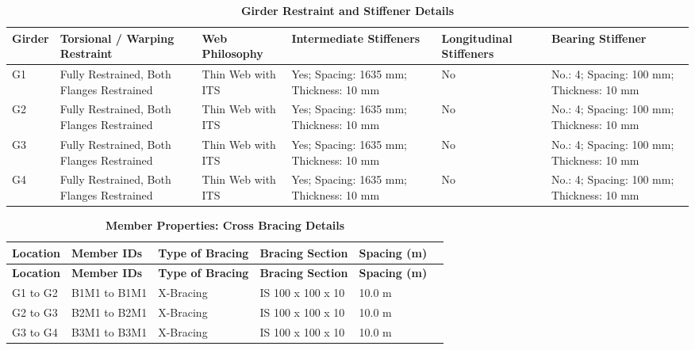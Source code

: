 \documentclass[12pt,a4paper]{report}
\newcommand{\ReportCompactTable}{\setlength{\tabcolsep}{3.5pt}}
\newcommand{\ReportLeftAlignedLongTable}{\setlength{\LTleft}{0pt}\setlength{\LTright}{\fill}}
\numberwithin{table}{chapter}
\numberwithin{figure}{chapter}
\begin{document}
\vspace{0.6em}

\vspace{4pt}
\begin{longtable}{|L{1.4cm}|p{2.2cm}|p{2.2cm}|p{3.0cm}|p{2.4cm}|p{2.2cm}|}
\caption{\textbf{Girder Restraint and Stiffener Details}}\\
\hline
\textbf{Girder} & \textbf{Torsional / Warping Restraint} & \textbf{Web Philosophy} & \textbf{Intermediate Stiffeners} & \textbf{Longitudinal Stiffeners} & \textbf{Bearing Stiffener} \\[6pt]
\hline
\endfirsthead
\endhead

G1 & Fully Restrained, Both Flanges Restrained & Thin Web with ITS & Yes; Spacing: 1635 mm; Thickness: 10 mm & No & No.: 4; Spacing: 100 mm; Thickness: 10 mm \\[8pt]
\hline
G2 & Fully Restrained, Both Flanges Restrained & Thin Web with ITS & Yes; Spacing: 1635 mm; Thickness: 10 mm & No & No.: 4; Spacing: 100 mm; Thickness: 10 mm \\[8pt]
\hline
G3 & Fully Restrained, Both Flanges Restrained & Thin Web with ITS & Yes; Spacing: 1635 mm; Thickness: 10 mm & No & No.: 4; Spacing: 100 mm; Thickness: 10 mm \\[8pt]
\hline
G4 & Fully Restrained, Both Flanges Restrained & Thin Web with ITS & Yes; Spacing: 1635 mm; Thickness: 10 mm & No & No.: 4; Spacing: 100 mm; Thickness: 10 mm \\[8pt]
\hline
\end{longtable}



\newpage

\vspace{0.4em}
\ReportCompactTable
\ReportLeftAlignedLongTable

\begin{longtable}{|L{2.2cm}|L{2.2cm}|L{3.0cm}|L{2.5cm}|C{1.8cm}|C{1.8cm}|}
\caption{\textbf{Member Properties: Cross Bracing Details}}
\hline
\textbf{Location} & \textbf{Member IDs} & \textbf{Type of Bracing} & \textbf{Bracing Section} & \textbf{Spacing (m)} \\
\hline
\endfirsthead
\textbf{Location} & \textbf{Member IDs} & \textbf{Type of Bracing} & \textbf{Bracing Section} & \textbf{Spacing (m)} \\
\hline
\endhead
G1 to G2 & B1M1 to B1M1 & X-Bracing & IS 100 x 100 x 10 & 10.0 m \\[6pt]
\hline
G2 to G3 & B2M1 to B2M1 & X-Bracing & IS 100 x 100 x 10 & 10.0 m \\[6pt]
\hline
G3 to G4 & B3M1 to B3M1 & X-Bracing & IS 100 x 100 x 10 & 10.0 m \\[6pt]
\hline
\end{longtable}
\end{document}
